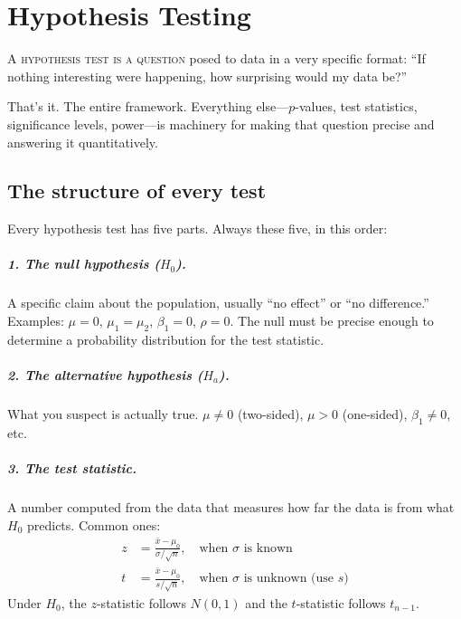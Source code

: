 \chapter{Hypothesis Testing}
\label{ch:hypothesis}

\noindent\textsc{A hypothesis test is a question} posed to data in a very specific format: ``If nothing interesting were happening, how surprising would my data be?''

That's it. The entire framework. Everything else---$p$-values, test statistics, significance levels, power---is machinery for making that question precise and answering it quantitatively.

\section{The structure of every test}

Every hypothesis test has five parts. Always these five, in this order:

\paragraph{1. The null hypothesis ($H_0$).} A specific claim about the population, usually ``no effect'' or ``no difference.'' Examples: $\mu = 0$, $\mu_1 = \mu_2$, $\beta_1 = 0$, $\rho = 0$. The null must be precise enough to determine a probability distribution for the test statistic.

\paragraph{2. The alternative hypothesis ($H_a$).} What you suspect is actually true. $\mu \neq 0$ (two-sided), $\mu > 0$ (one-sided), $\beta_1 \neq 0$, etc.

\paragraph{3. The test statistic.} A number computed from the data that measures how far the data is from what $H_0$ predicts. Common ones:
\begin{align}
  z &= \frac{\bar{x} - \mu_0}{\sigma/\sqrt{n}}, \quad \text{when $\sigma$ is known} \label{eq:z-test} \\[6pt]
  t &= \frac{\bar{x} - \mu_0}{s/\sqrt{n}}, \quad \text{when $\sigma$ is unknown (use $s$)} \label{eq:t-test}
\end{align}
Under $H_0$, the $z$-statistic follows $N(0,1)$ and the $t$-statistic follows $t_{n-1}$.

